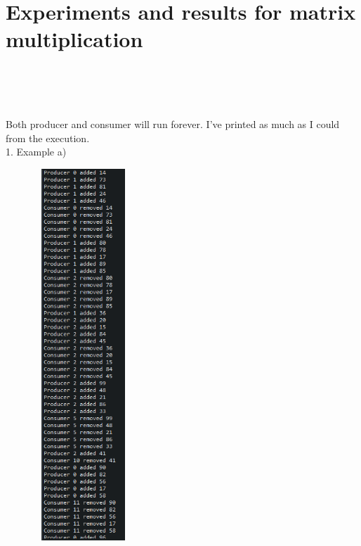 \documentclass[14pt]{article}
\begin{document}
\section*{Experiments and results for matrix multiplication}
\\\\\\
\begin{center}
Both producer and consumer will run forever. I've printed as much as I could from the execution.\\
1. Example a)\\
\vspace{10mm}

\includegraphics[height=5.5in, width = 2.3in]{coarse1.png}\\
\end{center}\\
\end{document}

